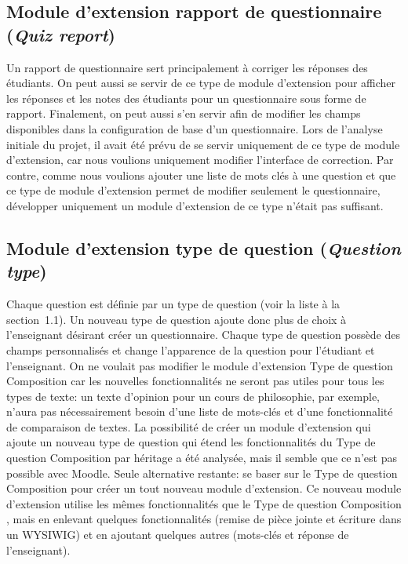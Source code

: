 \subsection{Module d'extension rapport de questionnaire (\textit{Quiz report})}
Un rapport de questionnaire sert principalement \`a corriger les r\'eponses des \'etudiants.
On peut aussi se servir de ce type de module d'extension pour afficher les r\'eponses et les notes des \'etudiants pour un questionnaire sous forme de rapport.
Finalement, on peut aussi s'en servir afin de modifier les champs disponibles dans la configuration de base d'un questionnaire.
Lors de l'analyse initiale du projet, il avait \'et\'e pr\'evu de se servir uniquement de ce type de module d'extension, car nous voulions uniquement modifier l'interface de correction.
Par contre, comme nous voulions ajouter une liste de mots cl\'es \`a une question et que ce type de module d'extension permet de modifier seulement le questionnaire, d\'evelopper uniquement un module d'extension de ce type n'\'etait pas suffisant.

\subsection{Module d'extension type de question (\textit{Question type})}
Chaque question est d\'efinie par un type de question (voir la liste \`a la section~1.1).
Un nouveau type de question ajoute donc plus de choix \`a l'enseignant d\'esirant cr\'eer un questionnaire.
Chaque type de question poss\`ede des champs personnalis\'es et change l'apparence de la question pour l'\'etudiant et l'enseignant.
On ne voulait pas modifier le module d'extension \og Type de question Composition \fg{} car les nouvelles fonctionnalit\'es ne seront pas utiles pour tous les types de texte: un texte d'opinion pour un cours de philosophie, par exemple, n'aura pas n\'ecessairement besoin d'une liste de mots-cl\'es et d'une fonctionnalit\'e de comparaison de textes.
La possibilit\'e de cr\'eer un module d'extension qui ajoute un nouveau type de question qui \'etend les fonctionnalit\'es du \og Type de question Composition \fg{} par h\'eritage a \'et\'e analys\'ee, mais il semble que ce n'est pas possible avec Moodle.
Seule alternative restante: se baser sur le \og Type de question Composition \fg{} pour cr\'eer un tout nouveau module d'extension.
Ce nouveau module d'extension utilise les m\^emes fonctionnalit\'es que le \og Type de question Composition \fg{}, mais en enlevant quelques fonctionnalit\'es (remise de pi\`ece jointe et \'ecriture dans un WYSIWIG) et en ajoutant quelques autres (mots-cl\'es et r\'eponse de l'enseignant).

